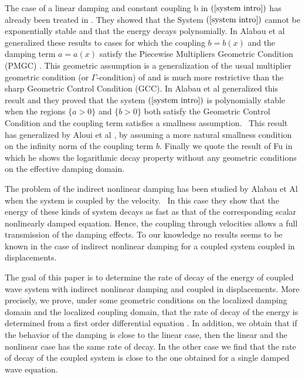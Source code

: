 \documentclass[11pt,reqno]{amsart}
\theoremstyle{plain}
\numberwithin{equation}{section}
\numberwithin{equation}{section}
\begin{document}
The case of a linear damping and constant coupling b in $\left( \ref{system
intro}\right) $ has already been treated in \cite{alab-canar-komo}. They
showed that the System $\left( \ref{system intro}\right) $ cannot be
exponentially stable and that the energy decays polynomially. In \cite%
{alab-lea stabilization} Alabau et al generalized these results to cases for
which the coupling $b=b(x)$ and the damping term $a=a(x)$ satisfy the
Piecewise Multipliers Geometric Condition (PMGC) \cite{alab-lea
stabilization}. This geometric assumption is a generalization of the usual
multiplier geometric condition (or $\Gamma $-condition) of \cite{Zua, lios}
and is much more restrictive than the sharp Geometric Control Condition
(GCC). In \cite{alab-lea control} Alabau et al generalized this result and
they proved that the system $\left( \ref{system intro}\right) $ is
polynomially stable when the regions $\{a>0\}$ and $\{b>0\}$ both satisfy
the Geometric Control Condition and the coupling term satisfies a smallness
assumption. \ This result has generalized by Aloui et al \cite{Aloui-daou},
by assuming a more natural smallness condition on the infinity norm of the
coupling term $b.$ Finally we quote the result of Fu \cite{X fu} in which he
shows the logarithmic decay property without any geometric conditions on the
effective damping domain.

The problem of the indirect nonlinear damping has been studied by Alabau et
Al \cite{Ala nonl} when the system is coupled by the velocity. \ In this
case they show that the energy of these kinds of system decays as fast as
that of the corresponding scalar nonlinearly damped equation. Hence, the
coupling through velocities allows a full transmission of the damping
effects. To our knowledge no results seems to be known in the case of
indirect nonlinear damping for a coupled system coupled in displacements.

The goal of this paper is to determine the rate of decay of the energy of
coupled wave system with indirect nonlinear damping and coupled in
displacements. More precisely, we prove, under some geometric conditions on
the localized damping domain and the localized coupling domain, that the
rate of decay of the energy is determined from a first order differential
equation . In addition, we obtain that if the behavior of the damping is
close to the linear case, then the linear and the nonlinear case has the
same rate of decay. In the other case we find that the rate of decay of the
coupled system is close to the one obtained for a single damped wave
equation.
\end{document}
